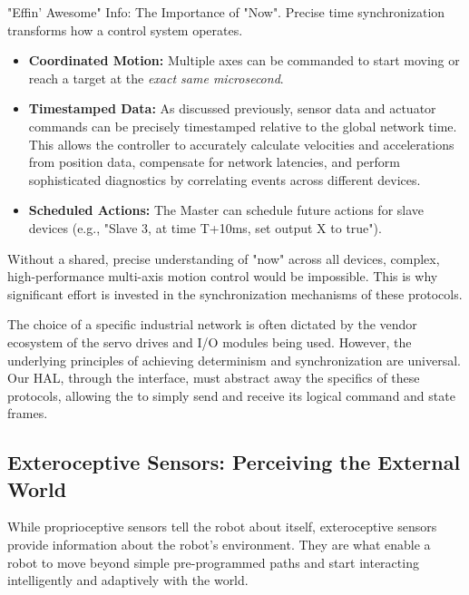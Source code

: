 \begin{principlebox}{"Effin' Awesome" Info: The Importance of "Now".}
    Precise time synchronization transforms how a control system operates. 
    \begin{itemize}
        \item \textbf{Coordinated Motion:} Multiple axes can be commanded to start moving or reach a target at the \textit{exact same microsecond}.
        \item \textbf{Timestamped Data:} As discussed previously, sensor data and actuator commands can be precisely timestamped relative to the global network time. This allows the controller to accurately calculate velocities and accelerations from position data, compensate for network latencies, and perform sophisticated diagnostics by correlating events across different devices.
        \item \textbf{Scheduled Actions:} The Master can schedule future actions for slave devices (e.g., "Slave 3, at time T+10ms, set output X to true").
    \end{itemize}
    Without a shared, precise understanding of "now" across all devices, complex, high-performance multi-axis motion control would be impossible. This is why significant effort is invested in the synchronization mechanisms of these protocols.
\end{principlebox}

The choice of a specific industrial network is often dictated by the vendor ecosystem of the servo drives and I/O modules being used. However, the underlying principles of achieving determinism and synchronization are universal. Our HAL, through the  interface, must abstract away the specifics of these protocols, allowing the  to simply send and receive its logical command and state frames.




\subsection{Exteroceptive Sensors: Perceiving the External World}
\label{subsec:exteroceptive_sensors}

While proprioceptive sensors tell the robot about itself, exteroceptive sensors provide information about the robot's environment. They are what enable a robot to move beyond simple pre-programmed paths and start interacting intelligently and adaptively with the world.

